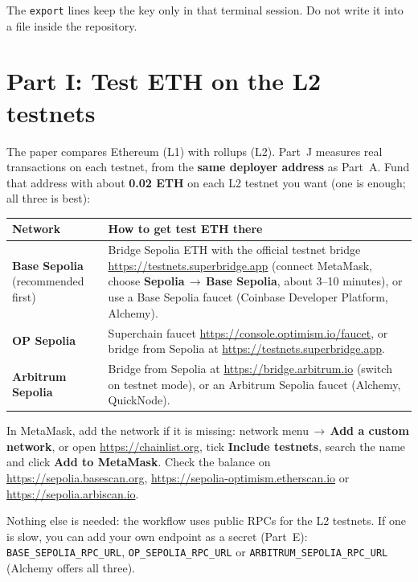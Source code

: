 \documentclass[11pt,a4paper]{article}
\newcommand{\ui}[1]{\textsf{\textbf{#1}}}
\newcommand{\code}[1]{\texttt{#1}}
\newcommand{\arr}{\,$\rightarrow$\,}
\begin{document}
{\small The \code{export} lines keep the key only in that terminal session. Do not write it into a file inside the repository.}


\section{Part I: Test ETH on the L2 testnets}
The paper compares Ethereum (L1) with rollups (L2). Part~J measures real transactions on each testnet, from the \textbf{same deployer address} as Part~A. Fund that address with about \textbf{0.02 ETH} on each L2 testnet you want (one is enough; all three is best):
\begin{center}
\renewcommand{\arraystretch}{1.2}
\begin{tabularx}{\textwidth}{@{}lX@{}}
\toprule
\textbf{Network} & \textbf{How to get test ETH there} \\
\midrule
\textbf{Base Sepolia} (recommended first) & Bridge Sepolia ETH with the official testnet bridge \url{https://testnets.superbridge.app} (connect MetaMask, choose \ui{Sepolia}\arr\ui{Base Sepolia}, about 3--10 minutes), or use a Base Sepolia faucet (Coinbase Developer Platform, Alchemy). \\
\textbf{OP Sepolia} & Superchain faucet \url{https://console.optimism.io/faucet}, or bridge from Sepolia at \url{https://testnets.superbridge.app}. \\
\textbf{Arbitrum Sepolia} & Bridge from Sepolia at \url{https://bridge.arbitrum.io} (switch on testnet mode), or an Arbitrum Sepolia faucet (Alchemy, QuickNode). \\
\bottomrule
\end{tabularx}
\end{center}
In MetaMask, add the network if it is missing: network menu\arr\ui{Add a custom network}, or open \url{https://chainlist.org}, tick \ui{Include testnets}, search the name and click \ui{Add to MetaMask}. Check the balance on \url{https://sepolia.basescan.org}, \url{https://sepolia-optimism.etherscan.io} or \url{https://sepolia.arbiscan.io}.

{\small Nothing else is needed: the workflow uses public RPCs for the L2 testnets. If one is slow, you can add your own endpoint as a secret (Part~E): \code{BASE\_SEPOLIA\_RPC\_URL}, \code{OP\_SEPOLIA\_RPC\_URL} or \code{ARBITRUM\_SEPOLIA\_RPC\_URL} (Alchemy offers all three).}
\end{document}

